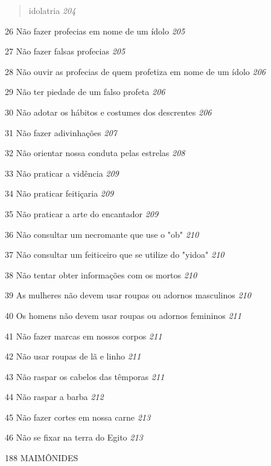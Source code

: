 \begin{quote}
idolatria \emph{204}
\end{quote}

26 Não fazer profecias em nome de um ídolo \emph{205}

27 Não fazer falsas profecias \emph{205}

28 Não ouvir as profecias de quem profetiza em nome de um ídolo
\emph{206}

29 Não ter piedade de um falso profeta \emph{206}

30 Não adotar os hábitos e costumes dos descrentes \emph{206}

31 Não fazer adivinhações \emph{207}

32 Não orientar nossa conduta pelas estrelas \emph{208}

33 Não praticar a vidência \emph{209}

34 Não praticar feitiçaria \emph{209}

35 Não praticar a arte do encantador \emph{209}

36 Não consultar um necromante que use o "ob" \emph{210}

37 Não consultar um feiticeiro que se utilize do "yidoa" \emph{210}

38 Não tentar obter informações com os mortos \emph{210}

39 As mulheres não devem usar roupas ou adornos masculinos \emph{210}

40 Os homens não devem usar roupas ou adornos femininos \emph{211}

41 Não fazer marcas em nossos corpos \emph{211}

42 Não usar roupas de lã e linho \emph{211}

43 Não raspar os cabelos das têmporas \emph{211}

44 Não raspar a barba \emph{212}

45 Não fazer cortes em nossa carne \emph{213}

46 Não se fixar na terra do Egito \emph{213}

188 MAIMÔNIDES

